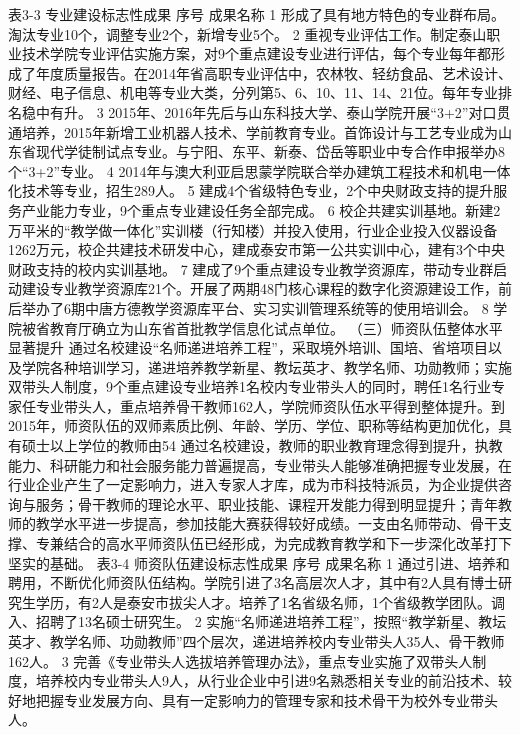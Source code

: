 表3-3  专业建设标志性成果
序号
成果名称
1
形成了具有地方特色的专业群布局。淘汰专业10个，调整专业2个，新增专业5个。
2
重视专业评估工作。制定泰山职业技术学院专业评估实施方案，对9个重点建设专业进行评估，每个专业每年都形成了年度质量报告。在2014年省高职专业评估中，农林牧、轻纺食品、艺术设计、财经、电子信息、机电等专业大类，分列第5、6、10、11、14、21位。每年专业排名稳中有升。
3
2015年、2016年先后与山东科技大学、泰山学院开展“3+2”对口贯通培养，2015年新增工业机器人技术、学前教育专业。首饰设计与工艺专业成为山东省现代学徒制试点专业。与宁阳、东平、新泰、岱岳等职业中专合作申报举办8个“3+2”专业。
4
2014年与澳大利亚启思蒙学院联合举办建筑工程技术和机电一体化技术等专业，招生289人。
5
建成4个省级特色专业，2个中央财政支持的提升服务产业能力专业，9个重点专业建设任务全部完成。
6
校企共建实训基地。新建2万平米的“教学做一体化”实训楼（行知楼）并投入使用，行业企业投入仪器设备1262万元，校企共建技术研发中心，建成泰安市第一公共实训中心，建有3个中央财政支持的校内实训基地。
7
建成了9个重点建设专业教学资源库，带动专业群启动建设专业教学资源库21个。开展了两期48门核心课程的数字化资源建设工作，前后举办了6期中唐方德教学资源库平台、实习实训管理系统等的使用培训会。
8
学院被省教育厅确立为山东省首批教学信息化试点单位。
（三）师资队伍整体水平显著提升
通过名校建设“名师递进培养工程”，采取境外培训、国培、省培项目以及学院各种培训学习，递进培养教学新星、教坛英才、教学名师、功勋教师；实施双带头人制度，9个重点建设专业培养1名校内专业带头人的同时，聘任1名行业专家任专业带头人，重点培养骨干教师162人，学院师资队伍水平得到整体提升。到2015年，师资队伍的双师素质比例、年龄、学历、学位、职称等结构更加优化，具有硕士以上学位的教师由54%
通过名校建设，教师的职业教育理念得到提升，执教能力、科研能力和社会服务能力普遍提高，专业带头人能够准确把握专业发展，在行业企业产生了一定影响力，进入专家人才库，成为市科技特派员，为企业提供咨询与服务；骨干教师的理论水平、职业技能、课程开发能力得到明显提升；青年教师的教学水平进一步提高，参加技能大赛获得较好成绩。一支由名师带动、骨干支撑、专兼结合的高水平师资队伍已经形成，为完成教育教学和下一步深化改革打下坚实的基础。
表3-4  师资队伍建设标志性成果
序号
成果名称
1
通过引进、培养和聘用，不断优化师资队伍结构。学院引进了3名高层次人才，其中有2人具有博士研究生学历，有2人是泰安市拔尖人才。培养了1名省级名师，1个省级教学团队。调入、招聘了13名硕士研究生。
2
实施“名师递进培养工程”，按照“教学新星、教坛英才、教学名师、功勋教师”四个层次，递进培养校内专业带头人35人、骨干教师162人。
3
完善《专业带头人选拔培养管理办法》，重点专业实施了双带头人制度，培养校内专业带头人9人，从行业企业中引进9名熟悉相关专业的前沿技术、较好地把握专业发展方向、具有一定影响力的管理专家和技术骨干为校外专业带头人。
